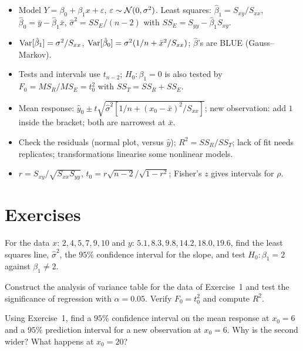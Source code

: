 \begin{summarybox}
\begin{itemize}
  \item Model $Y=\beta_0+\beta_1x+\varepsilon$, $\varepsilon\sim\mathcal{N}(0,\sigma^2)$. Least squares: $\hat\beta_1=S_{xy}/S_{xx}$, $\hat\beta_0=\bar{y}-\hat\beta_1\bar{x}$, $\hat\sigma^2=SS_E/(n-2)$ with $SS_E=S_{yy}-\hat\beta_1S_{xy}$.
  \item $\operatorname{Var}[\hat\beta_1]=\sigma^2/S_{xx}$, $\operatorname{Var}[\hat\beta_0]=\sigma^2(1/n+\bar{x}^2/S_{xx})$; $\hat\beta$'s are BLUE (Gauss--Markov).
  \item Tests and intervals use $t_{n-2}$; $H_0:\beta_1=0$ is also tested by $F_0=MS_R/MS_E=t_0^2$ with $SS_T=SS_R+SS_E$.
  \item Mean response: $\hat{y}_0\pm t\sqrt{\hat\sigma^2[1/n+(x_0-\bar{x})^2/S_{xx}]}$; new observation: add $1$ inside the bracket; both are narrowest at $\bar{x}$.
  \item Check the residuals (normal plot, versus $\hat{y}$); $R^2=SS_R/SS_T$; lack of fit needs replicates; transformations linearise some nonlinear models.
  \item $r=S_{xy}/\sqrt{S_{xx}S_{yy}}$, $t_0=r\sqrt{n-2}/\sqrt{1-r^2}$; Fisher's $z$ gives intervals for $\rho$.
\end{itemize}
\end{summarybox}

\section{Exercises}

\begin{exercise}
For the data $x$: $2,4,5,7,9,10$ and $y$: $5.1,8.3,9.8,14.2,18.0,19.6$, find the least squares line, $\hat\sigma^2$, the $95\%$ confidence interval for the slope, and test $H_0:\beta_1=2$ against $\beta_1\ne2$.
\end{exercise}

\begin{exercise}
Construct the analysis of variance table for the data of Exercise~1 and test the significance of regression with $\alpha=0.05$. Verify $F_0=t_0^2$ and compute $R^2$.
\end{exercise}

\begin{exercise}
Using Exercise~1, find a $95\%$ confidence interval on the mean response at $x_0=6$ and a $95\%$ prediction interval for a new observation at $x_0=6$. Why is the second wider? What happens at $x_0=20$?
\end{exercise}

